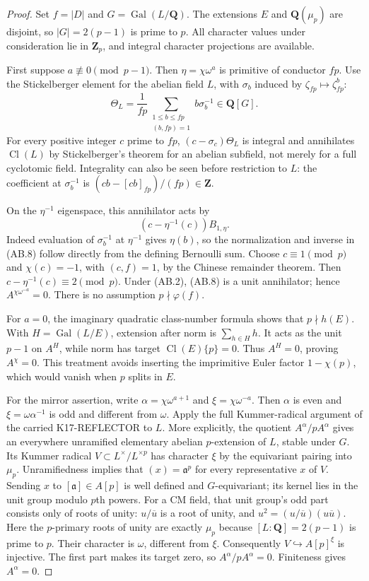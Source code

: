 \documentclass[11pt,a4paper]{article}
\theoremstyle{definition}
\begin{document}
\begin{proof}
Set $f=|D|$ and $G=\operatorname{Gal}(L/\mathbf Q)$.
The extensions $E$ and $\mathbf Q(\mu_p)$ are disjoint,
so $|G|=2(p-1)$ is prime to $p$.  All character values
under consideration lie in $\mathbf Z_p$, and integral
character projections are available.

First suppose $a\not\equiv0\pmod{p-1}$.  Then
$\eta=\chi\omega^a$ is primitive of conductor $fp$.
Use the Stickelberger element for the abelian field $L$,
with $\sigma_b$ induced by $\zeta_{fp}\mapsto\zeta_{fp}^b$:
\[
 \Theta_L=\frac1{fp}\sum_{\substack{1\le b\le fp\\(b,fp)=1}}
                     b\sigma_b^{-1}\in\mathbf Q[G].       \tag{AB.7}
\]
For every positive integer $c$ prime to $fp$,
$(c-\sigma_c)\Theta_L$ is integral and annihilates
$\operatorname{Cl}(L)$ by Stickelberger's theorem for an
abelian subfield, not merely for a full cyclotomic field.
Integrality can also be seen before restriction to $L$:
the coefficient at $\sigma_b^{-1}$ is
$(cb-[cb]_{fp})/(fp)\in\mathbf Z$.

On the $\eta^{-1}$ eigenspace, this annihilator acts by
\[
                  (c-\eta^{-1}(c))B_{1,\eta}.             \tag{AB.8}
\]
Indeed evaluation of $\sigma_b^{-1}$ at $\eta^{-1}$
gives $\eta(b)$, so the normalization and inverse in
(AB.8) follow directly from the defining Bernoulli sum.
Choose $c\equiv1\pmod p$ and $\chi(c)=-1$, with
$(c,f)=1$, by the Chinese remainder theorem.  Then
$c-\eta^{-1}(c)\equiv2\pmod p$.  Under (AB.2), (AB.8)
is a unit annihilator; hence $A^{\chi\omega^{-a}}=0$.
There is no assumption $p\nmid\varphi(f)$.

For $a=0$, the imaginary quadratic class-number formula
shows that $p\nmid h(E)$.  With
$H=\operatorname{Gal}(L/E)$, extension after norm is
$\sum_{h\in H}h$.  It acts as the unit $p-1$ on $A^H$,
while norm has target $\operatorname{Cl}(E)\{p\}=0$.
Thus $A^H=0$, proving $A^\chi=0$.  This treatment avoids
inserting the imprimitive Euler factor $1-\chi(p)$, which
would vanish when $p$ splits in $E$.

For the mirror assertion, write
$\alpha=\chi\omega^{a+1}$ and $\xi=\chi\omega^{-a}$.
Then $\alpha$ is even and $\xi=\omega\alpha^{-1}$ is
odd and different from $\omega$.  Apply the full
Kummer-radical argument of the carried K17-REFLECTOR to
$L$.  More explicitly, the quotient
$A^\alpha/pA^\alpha$ gives an everywhere unramified
elementary abelian $p$-extension of $L$, stable under $G$.
Its Kummer radical $V\subset L^\times/L^{\times p}$ has
character $\xi$ by the equivariant pairing into $\mu_p$.
Unramifiedness implies that $(x)=\mathfrak a^p$ for every
representative $x$ of $V$.  Sending $x$ to
$[\mathfrak a]\in A[p]$ is well defined and $G$-equivariant;
its kernel lies in the unit group modulo $p$th powers.
For a CM field, that unit group's odd part consists only
of roots of unity: $u/\overline u$ is a root of unity,
and $u^2=(u/\overline u)(u\overline u)$.
Here the $p$-primary roots of unity are exactly $\mu_p$
because $[L:\mathbf Q]=2(p-1)$ is prime to $p$.
Their character is $\omega$, different from $\xi$.
Consequently $V\hookrightarrow A[p]^\xi$ is injective.
The first part makes its target zero, so
$A^\alpha/pA^\alpha=0$.  Finiteness gives $A^\alpha=0$.


\end{proof}
\end{document}
